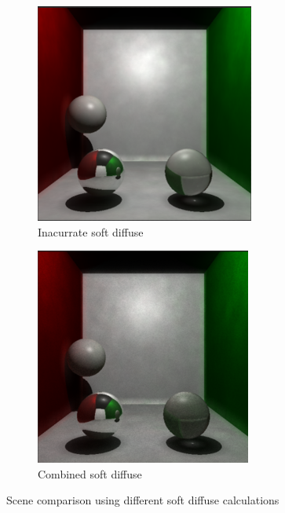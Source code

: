 \documentclass{article}
\begin{document}
\begin{figure}
\centering

\begin{subfigure}{.5\textwidth}
\centering
\includegraphics[width=0.85\linewidth]{inaccurate_sft_diff_RAW}
\caption{Inacurrate soft diffuse}
\label{fig:sub3}
\end{subfigure}%
\begin{subfigure}{.5\textwidth}
\centering
\includegraphics[width=0.85\linewidth]{comb_sft_diff_RAW}
\caption{Combined soft diffuse}
\label{fig:sub4}
\end{subfigure}

\caption{Scene comparison using different soft diffuse calculations}
\label{fig:AccuracyComp}
\end{figure}
\end{document}
